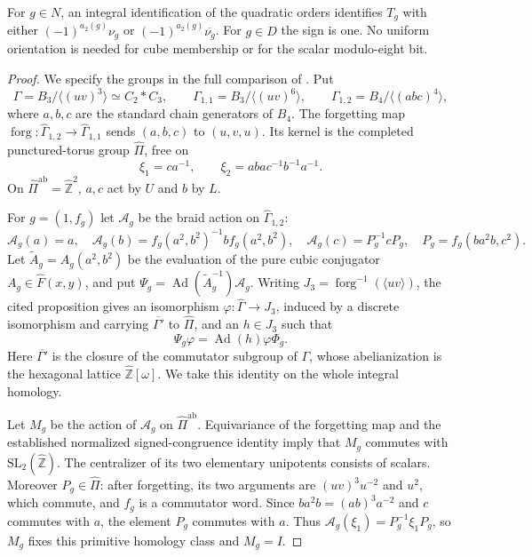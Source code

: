 \begin{proposition}\label{prop:lr-integral-cubic-beta}
For $g\in N$, an integral identification of the quadratic orders
identifies $T_g$ with either $(-1)^{a_2(g)}\nu_g$ or
$(-1)^{a_2(g)}\overline{\nu_g}$. For $g\in D$ the sign is one.
No uniform orientation is needed for cube membership or for the
scalar modulo-eight bit.
\end{proposition}
\begin{proof}
We specify the groups in the full comparison of
\cite[Proposition~18]{H17}. Put
\[
 \Gamma=B_3/\langle(uv)^3\rangle\simeq C_2*C_3,\qquad
 \Gamma_{1,1}=B_3/\langle(uv)^6\rangle,\qquad
 \Gamma_{1,2}=B_4/\langle(abc)^4\rangle,
\]
where $a,b,c$ are the standard chain generators of $B_4$.
The forgetting map
$\operatorname{forg}:\widehat\Gamma_{1,2}\to
\widehat\Gamma_{1,1}$ sends $(a,b,c)$ to $(u,v,u)$.
Its kernel is the completed punctured-torus group $\widehat\Pi$,
free on
\[
 \xi_1=ca^{-1},\qquad
 \xi_2=abac^{-1}b^{-1}a^{-1}.
\]
On $\widehat\Pi^{\mathrm{ab}}=\widehat{\mathbb Z}^2$,
$a,c$ act by $U$ and $b$ by $L$.

For $g=(1,f_g)$ let $\mathcal A_g$ be the braid action on
$\widehat\Gamma_{1,2}$:
\[
 \mathcal A_g(a)=a,\quad
 \mathcal A_g(b)=f_g(a^2,b^2)^{-1}b f_g(a^2,b^2),\quad
 \mathcal A_g(c)=P_g^{-1}cP_g,\quad
 P_g=f_g(ba^2b,c^2).
\]
Let $\widetilde A_g=A_g(a^2,b^2)$ be the evaluation of the
pure cubic conjugator $A_g\in\widehat F(x,y)$, and put
$\Psi_g=\operatorname{Ad}(\widetilde A_g^{-1})\mathcal A_g$.
Writing $J_3=\operatorname{forg}^{-1}(\langle uv\rangle)$,
the cited proposition gives an isomorphism
$\varphi:\widehat\Gamma\to J_3$, induced by a discrete
isomorphism and carrying $\overline{\Gamma'}$ to
$\widehat\Pi$, and an $h\in J_3$ such that
\[
 \Psi_g\varphi=\operatorname{Ad}(h)\varphi\Phi_g .
\]
Here $\overline{\Gamma'}$ is the closure of the commutator
subgroup of $\Gamma$, whose abelianization is the hexagonal
lattice $\widehat{\mathbb Z}[\omega]$.
We take this identity on the whole integral homology.

Let $M_g$ be the action of $\mathcal A_g$ on
$\widehat\Pi^{\mathrm{ab}}$. Equivariance of the forgetting map
and the established normalized signed-congruence identity imply
that $M_g$ commutes with $\mathrm{SL}_2(\widehat{\mathbb Z})$.
The centralizer of its two elementary unipotents consists of
scalars. Moreover $P_g\in\widehat\Pi$: after forgetting,
its two arguments are $(uv)^3u^{-2}$ and $u^2$, which commute,
and $f_g$ is a commutator word. Since
$ba^2b=(ab)^3a^{-2}$ and $c$ commutes with $a$, the element
$P_g$ commutes with $a$. Thus
$\mathcal A_g(\xi_1)=P_g^{-1}\xi_1P_g$, so $M_g$ fixes this
primitive homology class and $M_g=I$.


\end{proof}
